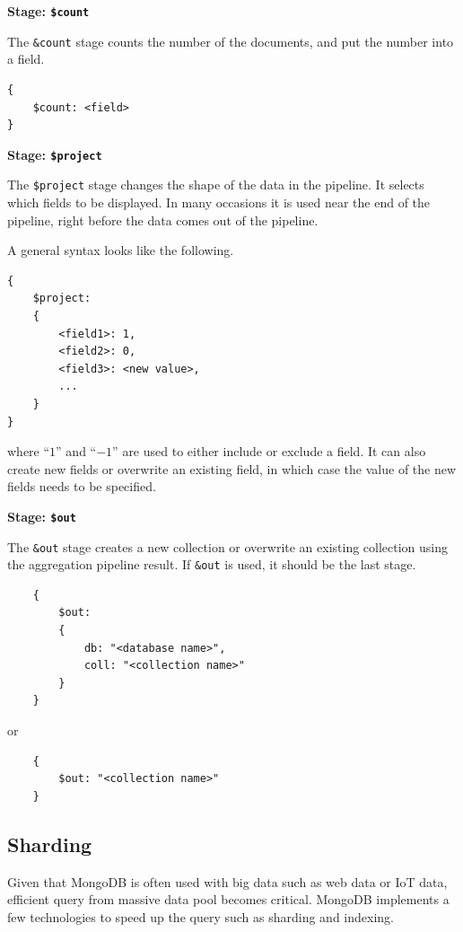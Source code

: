 \vspace{0.1in}
\noindent \textbf{Stage: \texttt{\$count}}
\vspace{0.1in}

The \verb|&count| stage counts the number of the documents, and put the number into a field.
\begin{lstlisting}
{
	$count: <field>
}
\end{lstlisting}

\vspace{0.1in}
\noindent \textbf{Stage: \texttt{\$project}}
\vspace{0.1in}

The \verb|$project| stage changes the shape of the data in the pipeline. It selects which fields to be displayed. In many occasions it is used near the end of the pipeline, right before the data comes out of the pipeline. 

A general syntax looks like the following.
\begin{lstlisting}
{
	$project:
	{
		<field1>: 1,
		<field2>: 0,
		<field3>: <new value>,
		...
	}
}
\end{lstlisting}
where ``$1$'' and ``$-1$'' are used to either include or exclude a field. It can also create new fields or overwrite an existing field, in which case the value of the new fields needs to be specified.

\vspace{0.1in}
\noindent \textbf{Stage: \texttt{\$out}}
\vspace{0.1in}

The \verb|&out| stage creates a new collection or overwrite an existing collection using the aggregation pipeline result. If \verb|&out| is used, it should be the last stage.
\begin{lstlisting}
	{
		$out:
		{
			db: "<database name>",
			coll: "<collection name>"
		}
	}
\end{lstlisting}
or
\begin{lstlisting}
	{
		$out: "<collection name>"
	}
\end{lstlisting}

\subsection{Sharding}

Given that MongoDB is often used with big data such as web data or IoT data, efficient query from massive data pool becomes critical. MongoDB implements a few technologies to speed up the query such as sharding and indexing.


